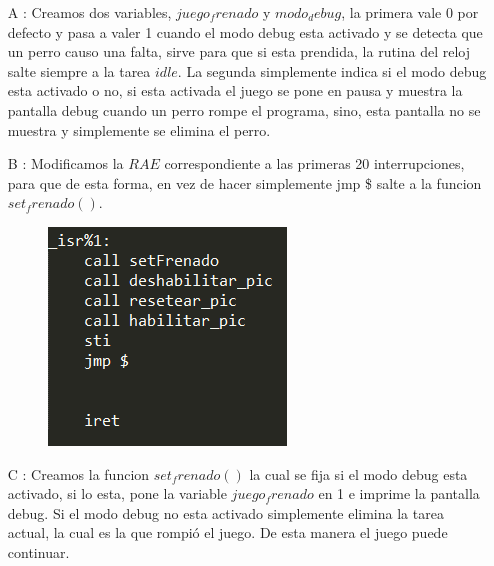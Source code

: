 \begin{itemize}

\item[A]: Creamos dos variables, $juego_frenado$ y $modo_debug$, la primera vale 0 por defecto y pasa a valer 1 cuando el modo debug esta activado y se detecta que un perro causo una falta, sirve para que si esta prendida, la rutina del reloj salte siempre a la tarea $idle$. La segunda simplemente indica si el modo debug esta activado o no, si esta activada el juego se pone en pausa y muestra la pantalla debug cuando un perro rompe el programa, sino, esta pantalla no se muestra y simplemente se elimina el perro.

\item[B]: Modificamos la $RAE$ correspondiente a las primeras 20 interrupciones, para que de esta forma, en vez de hacer simplemente jmp \$ salte a la funcion $set_frenado()$.

\begin{figure}[H]
\begin{center}
\includegraphics[width=\linewidth]{ejercicio7/isr.png}
\endminipage
\end{center}
\end{figure}


\item[C]: Creamos la funcion $set_frenado()$ la cual se fija si el modo debug esta activado, si lo esta, pone la variable $juego_frenado$ en 1 e imprime la pantalla debug. Si el modo debug no esta activado simplemente elimina la tarea actual, la cual es la que rompió el juego. De esta manera el juego puede continuar.


\end{itemize}
